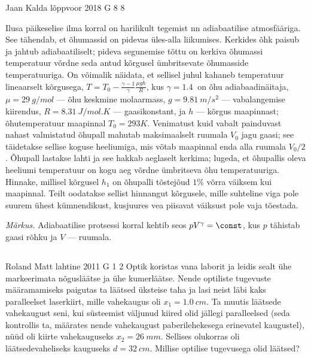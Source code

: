 \documentclass[11pt]{article}
\begin{document}
{%
{Jaan Kalda} %
{lõppvoor} %
{2018} %
{G 8} %
{8} %
{
\ifStatement
Ilusa päikeselise ilma korral on harilikult tegemist nn adiabaatilise atmosfääriga. See tähendab, et õhumassid on pidevas üles-alla liikumises. Kerkides õhk paisub ja jahtub adiabaatiliselt; pideva segunemise tõttu on kerkiva õhumassi temperatuur võrdne seda antud kõrgusel ümbritsevate õhumasside temperatuuriga. On võimalik näidata, et sellisel juhul kahaneb temperatuur lineaarselt kõrgusega, $T=T_0-\frac{\gamma-1}\gamma\frac{\mu g h}R$, kus $\gamma=\SI{1.4}{	}$ on õhu adiabaadinäitaja, $\mu=\SI{29}{g/mol}$ --- õhu keskmine molaarmass, $g=\SI{9.81}{m/s^2}$ --- vabalangemise kiirendus, $R=\SI{8.31}{J/mol.K}$ --- gaasikonstant, ja $h$ --- kõrgus maapinnast; õhutemperatuur maapinnal $T_0=\SI{293}K$. Venimatust kuid vabalt painduvast nahast valmistatud õhupall mahutab maksimaalselt ruumala $V_0$ jagu gaasi; see täidetakse sellise koguse heeliumiga, mis võtab maapinnal enda alla ruumala $V_0/2$. Õhupall lastakse lahti ja see hakkab aeglaselt kerkima; lugeda, et õhupallis oleva heeliumi temperatuur on kogu aeg võrdne ümbritseva õhu temperatuuriga. Hinnake, millisel kõrgusel $h_1$ on õhupalli tõstejõud $1\%$ võrra väiksem kui maapinnal. Teilt oodatakse sellist hinnangut kõrgusele, mille suhteline viga pole suurem ühest kümnendikust, kusjuures vea piisavat väiksust pole vaja tõestada. 

\emph{Märkus.} Adiabaatilise protsessi korral kehtib seos $pV^\gamma = \const$, kus $p$ tähistab gaasi rõhku ja $V$ --- ruumala.
\fi
}
\newpage\subsection{\protect{}}

{Roland Matt} %
{lahtine} %
{2011} %
{G 1} %
{2} %
{
\ifStatement
Optik koristas vana laborit ja leidis sealt ühe markeerimata nõgusläätse ja ühe
kumerläätse. Nende optiliste tugevuste määramamiseks paigutas ta läätsed
üksteise taha ja lasi neist läbi kaks paralleelset laserkiirt, mille vahekaugus
oli $x_{1}=\SI{1,0}{cm}$. Ta muutis läätsede vahekaugust seni, kui süsteemist väljunud
kiired olid jällegi paralleelsed (seda kontrollis ta, määrates nende vahekaugust
paberilehekesega erinevatel kaugustel), nüüd oli kiirte vahekauguseks
$x_{2}=\SI{26}{mm}$. Sellises olukorras oli läätsedevaheliseks kauguseks 
$d=\SI{32}{cm}$.
Millise optilise tugevusega olid läätsed?
\fi
}

}
\end{document}

